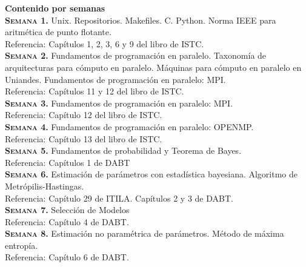 \documentclass[letterpaper,10pt,onecolumn]{article}
\begin{document}
\noindent\textbf{\large {} \quad Contenido por
  semanas}\\[-0.2cm] 



\noindent\normalsize\textbf{\textsc{Semana 1.}}
Unix. Repositorios. Makefiles. C. Python. Norma IEEE para aritm\'etica de punto
flotante. \\
Referencia: Cap\'itulos 1, 2, 3, 6 y 9 del libro de ISTC.
\\[-0.3cm]

\noindent\textbf{\textsc{Semana 2.}} 
Fundamentos de programaci\'on en paralelo. Taxonom\'ia de arquitecturas
para c\'omputo en paralelo. M\'aquinas para c\'omputo en paralelo en
Uniandes.  Fundamentos de programaci\'on en paralelo: MPI.\\
Referencia: Cap\'itulos 11 y 12 del libro de ISTC.
\\[-0.3cm]  

\noindent\textbf{\textsc{Semana 3.}} 
Fundamentos de programaci\'on en paralelo: MPI.\\
Referencia: Cap\'itulo 12 del libro de ISTC.
\\[-0.3cm]  

\noindent\textbf{\textsc{Semana 4.}} 
Fundamentos de programaci\'on en paralelo: OPENMP.\\
Referencia: Cap\'itulo 13 del libro de ISTC.
\\[-0.3cm]  

\noindent\textbf{\textsc{Semana 5.}}
Fundamentos de probabilidad y Teorema de Bayes.\\
Referencia: Cap\'itulos 1 de DABT
\\[-0.3cm]

\noindent\textbf{\textsc{Semana 6.}} 
Estimaci\'on de par\'ametros con estad\'istica bayesiana. Algoritmo de Metr\'opilis-Hastingas.\\
Referencia: Cap\'itulo 29 de ITILA. Cap\'itulos 2 y 3 de DABT.  
\\[-0.3cm]  

\noindent\textbf{\textsc{Semana 7.}} 
Selecci\'on de Modelos\\
Referencia: Cap\'itulo 4 de DABT.
\\[-0.3cm] 

\noindent\textbf{\textsc{Semana 8.}} 
Estimaci\'on no param\'etrica de par\'ametros. M\'etodo de m\'axima entrop\'ia.\\
Referencia: Cap\'itulo 6 de DABT.
\\[-0.3cm]   
\end{document}
